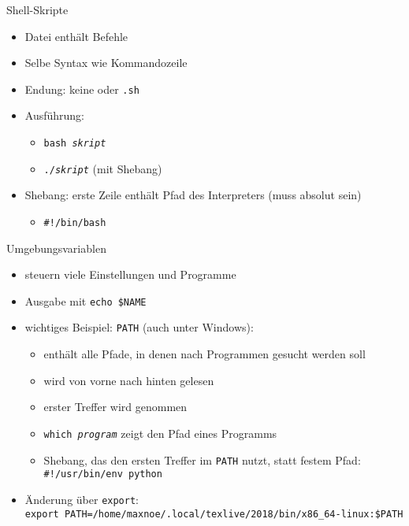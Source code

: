 \begin{frame}{Shell-Skripte}
  \begin{itemize}
    \item Datei enthält Befehle
    \item Selbe Syntax wie Kommandozeile
    \item Endung: keine oder \texttt{.sh}
    \item Ausführung:
      \begin{itemize}
        \item \texttt{bash \textit{skript}}
        \item \texttt{./\textit{skript}} (mit Shebang)
      \end{itemize}
    \item Shebang: erste Zeile enthält Pfad des Interpreters (muss absolut sein)
      \begin{itemize}
        \item \texttt{\#!/bin/bash}
      \end{itemize}
  \end{itemize}
\end{frame}

\begin{frame}{Umgebungsvariablen}
  \begin{itemize}
    \item steuern viele Einstellungen und Programme
    \item Ausgabe mit \texttt{echo \$NAME}
    \item wichtiges Beispiel: \texttt{PATH} (auch unter Windows):
      \begin{itemize}
        \item enthält alle Pfade, in denen nach Programmen gesucht werden soll
        \item wird von vorne nach hinten gelesen
        \item erster Treffer wird genommen
        \item \texttt{which \textit{program}} zeigt den Pfad eines Programms
        \item Shebang, das den ersten Treffer im \texttt{PATH} nutzt, statt festem Pfad: \texttt{\#!/usr/bin/env python}
      \end{itemize}
    \item Änderung über \texttt{export}:\\
      \texttt{export PATH=/home/maxnoe/.local/texlive/2018/bin/x86\_64-linux:\$PATH}
  \end{itemize} 
\end{frame}

